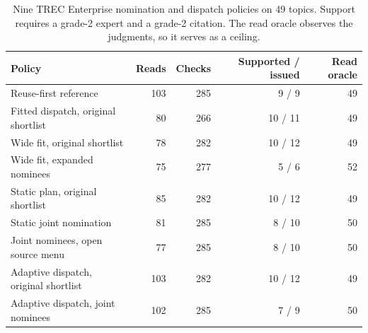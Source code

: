 \begin{table}[t]
\caption{Nine TREC Enterprise nomination and dispatch policies on 49 topics. Support requires a grade-2 expert and a grade-2 citation. The read oracle observes the judgments, so it serves as a ceiling.}
\label{tab:trec-transfer}
\small\centering
\begin{tabular}{@{}lrrrr@{}}
\toprule
Policy & Reads & Checks & Supported / issued & Read oracle \\
\midrule
Reuse-first reference & 103 & 285 & 9 / 9 & 49 \\
Fitted dispatch, original shortlist & 80 & 266 & 10 / 11 & 49 \\
Wide fit, original shortlist & 78 & 282 & 10 / 12 & 49 \\
Wide fit, expanded nominees & 75 & 277 & 5 / 6 & 52 \\
Static plan, original shortlist & 85 & 282 & 10 / 12 & 49 \\
Static joint nomination & 81 & 285 & 8 / 10 & 50 \\
Joint nominees, open source menu & 77 & 285 & 8 / 10 & 50 \\
Adaptive dispatch, original shortlist & 103 & 282 & 10 / 12 & 49 \\
Adaptive dispatch, joint nominees & 102 & 285 & 7 / 9 & 50 \\
\bottomrule
\end{tabular}
\end{table}
